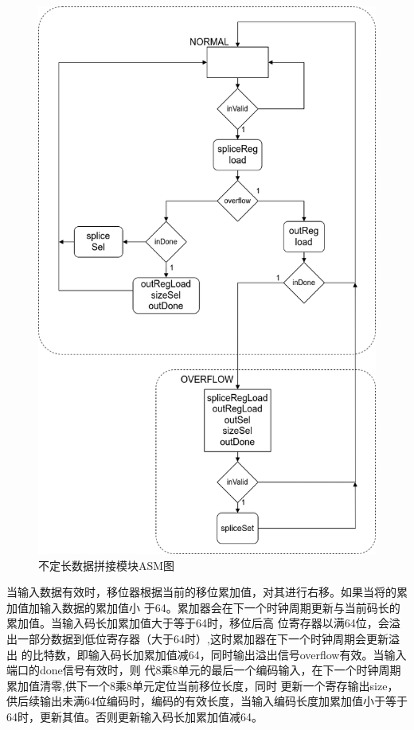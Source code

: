 \documentclass{article}
\numberwithin {equation}{section}
\begin{document}
\begin{spacing}{1.25}
      \begin{figure}[H]
        \centering
        \includegraphics[scale=0.5]{./pictures/spliceASM.png}
        \caption{不定长数据拼接模块ASM图}
        \label{spliceASM}
      \end{figure}
      
      当输入数据有效时，移位器根据当前的移位累加值，对其进行右移。如果当将的累加值加输入数据的累加值小
      于64。累加器会在下一个时钟周期更新与当前码长的累加值。当输入码长加累加值大于等于64时，移位后高
      位寄存器以满64位，会溢出一部分数据到低位寄存器（大于64时）,这时累加器在下一个时钟周期会更新溢出
      的比特数，即输入码长加累加值减64，同时输出溢出信号overflow有效。当输入端口的done信号有效时，则
      代8乘8单元的最后一个编码输入，在下一个时钟周期累加值清零,供下一个8乘8单元定位当前移位长度，同时
      更新一个寄存输出size，供后续输出未满64位编码时，编码的有效长度，当输入编码长度加累加值小于等于
      64时，更新其值。否则更新输入码长加累加值减64。


\end{spacing}
\end{document}
